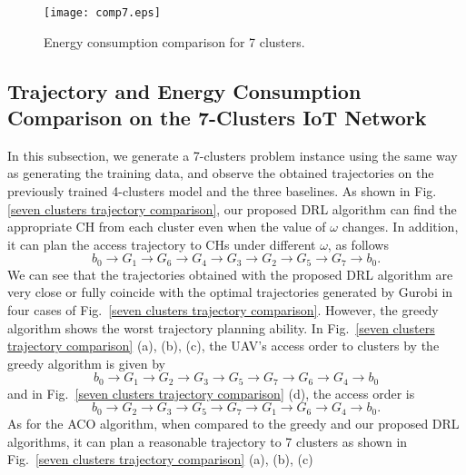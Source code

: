 \documentclass[journal]{IEEEtran}
\begin{document}
\begin{figure}[!t]
	\centering
	\texttt{[image: comp7.eps]}
	\caption{Energy consumption comparison for 7 clusters.}
	\label{comparisonratiocir}
\end{figure}

\subsection{Trajectory and Energy Consumption Comparison on the 7-Clusters IoT Network}



 {In this subsection, we generate a 7-clusters problem instance using the same way as generating the training data, and observe the obtained trajectories on the previously trained 4-clusters model and the three baselines.} As shown in Fig. \ref{seven clusters trajectory comparison},  our proposed DRL algorithm can find the appropriate CH from each cluster even when the value of $\omega$ changes. In addition, it can plan the access trajectory to CHs under different $\omega$, as follows
\begin{equation*}
    b_0 \rightarrow G_{1} \rightarrow G_{6}  \rightarrow G_{4} \rightarrow G_{3} \rightarrow G_{2} \rightarrow G_{5} \rightarrow G_{7} \rightarrow b_0.
\end{equation*}
We can see that the trajectories obtained with the proposed DRL algorithm are very close or fully coincide with the optimal trajectories generated by Gurobi in four cases of Fig.~\ref{seven clusters trajectory comparison}.  However, the greedy algorithm shows the worst trajectory planning ability. In Fig.~\ref{seven clusters trajectory comparison} (a), (b), (c), the UAV's access order to clusters by the greedy algorithm is given by
\begin{equation*}
    b_0 \rightarrow G_{1} \rightarrow G_{2}  \rightarrow G_{3} \rightarrow G_{5} \rightarrow G_{7} \rightarrow G_{6} \rightarrow G_{4} \rightarrow b_0
\end{equation*}
and in Fig.~\ref{seven clusters trajectory comparison} (d), the access order is
\begin{equation*}
    b_0 \rightarrow G_{2} \rightarrow G_{3}  \rightarrow G_{5} \rightarrow G_{7} \rightarrow G_{1} \rightarrow G_{6} \rightarrow G_{4} \rightarrow b_0.
\end{equation*}
As for the ACO algorithm, when compared to the greedy and our proposed DRL algorithms, it can plan a reasonable trajectory to 7 clusters as shown in Fig.~\ref{seven clusters trajectory comparison} (a), (b), (c)
\end{document}
